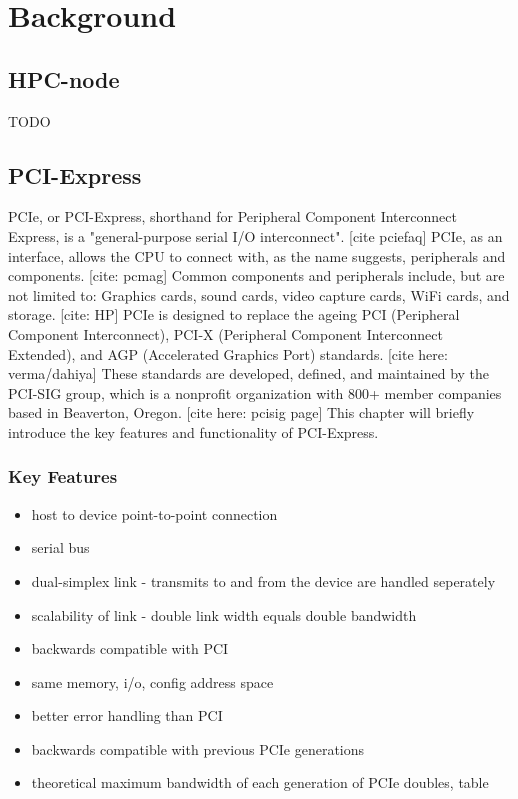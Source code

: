 
\chapter{Background}\label{chapter:Background}

\section{HPC-node}

TODO

\section{PCI-Express}
PCIe, or PCI-Express, shorthand for Peripheral Component Interconnect Express, is a "general-purpose serial I/O interconnect". [cite pciefaq] PCIe, as an interface, allows the CPU to connect with, as the name suggests, peripherals and components. [cite: pcmag] Common components and peripherals include, but are not limited to: Graphics cards, sound cards, video capture cards, WiFi cards, and storage. [cite: HP]
PCIe is designed to replace the ageing PCI (Peripheral Component Interconnect), PCI-X (Peripheral Component Interconnect Extended), and AGP (Accelerated Graphics Port) standards. [cite here: verma/dahiya] These standards are developed, defined, and maintained by the PCI-SIG group, which is a nonprofit organization with 800+ member companies based in Beaverton, Oregon. [cite here: pcisig page] This chapter will briefly introduce the key features and functionality of PCI-Express.

\subsection{Key Features}

\begin{itemize}
\item host to device point-to-point connection
\item serial bus
\item dual-simplex link - transmits to and from the device are handled seperately
\item scalability of link - double link width equals double bandwidth
\item backwards compatible with PCI
\item same memory, i/o, config address space
\item better error handling than PCI
\item backwards compatible with previous PCIe generations
\item theoretical maximum bandwidth of each generation of PCIe doubles, table

\end{itemize}

